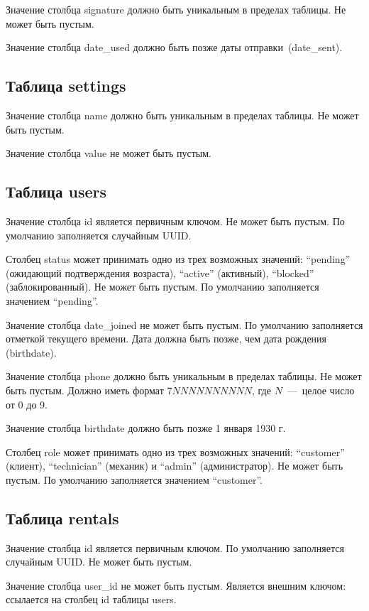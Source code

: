 Значение столбца signature должно быть уникальным в пределах таблицы. Не может быть пустым.

Значение столбца date\_used должно быть позже даты отправки~(date\_sent).

\subsection{Таблица settings}

Значение столбца name должно быть уникальным в пределах таблицы. Не может быть пустым.

Значение столбца value не может быть пустым.

\subsection{Таблица users}

Значение столбца id является первичным ключом. Не может быть пустым. По умолчанию заполняется случайным UUID.

Столбец status может принимать одно из трех возможных значений: \enquote{pending} (ожидающий подтверждения возраста), \enquote{active} (активный), \enquote{blocked} (заблокированный). Не может быть пустым. По умолчанию заполняется значением \enquote{pending}.

Значение столбца date\_joined не может быть пустым. По умолчанию заполняется отметкой текущего времени. Дата должна быть позже, чем дата рождения (birthdate).

Значение столбца phone должно быть уникальным в пределах таблицы. Не может быть пустым. Должно иметь формат 7$NNNNNNNNNN$, где $N$~---~целое число от 0 до 9.

Значение столбца birthdate должно быть позже 1 января 1930 г.

Столбец role может принимать одно из трех возможных значений: \enquote{customer} (клиент), \enquote{technician} (механик) и \enquote{admin} (администратор). Не может быть пустым. По умолчанию заполняется значением \enquote{customer}.

\subsection{Таблица rentals}

Значение столбца id является первичным ключом. По умолчанию заполняется случайным UUID. Не может быть пустым.

Значение столбца user\_id не может быть пустым. Является внешним ключом: ссылается на столбец id таблицы users.

